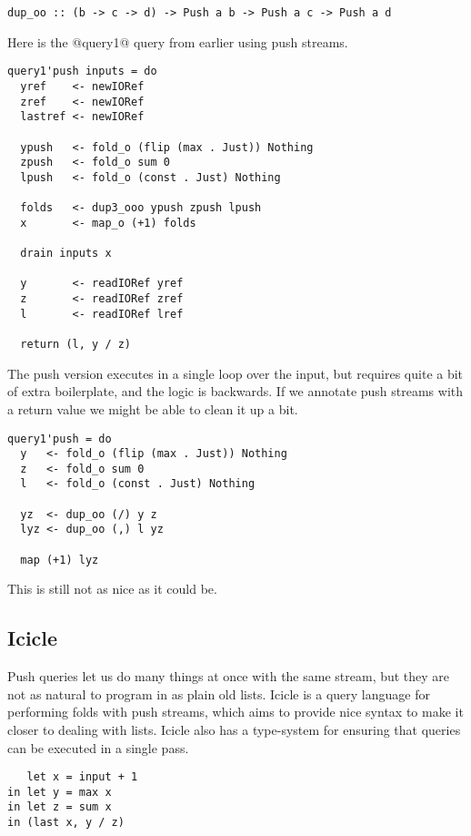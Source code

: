 \begin{lstlisting}
dup_oo :: (b -> c -> d) -> Push a b -> Push a c -> Push a d
\end{lstlisting}

Here is the @query1@ query from earlier using push streams.

\begin{lstlisting}
query1'push inputs = do
  yref    <- newIORef
  zref    <- newIORef
  lastref <- newIORef

  ypush   <- fold_o (flip (max . Just)) Nothing
  zpush   <- fold_o sum 0
  lpush   <- fold_o (const . Just) Nothing

  folds   <- dup3_ooo ypush zpush lpush
  x       <- map_o (+1) folds

  drain inputs x

  y       <- readIORef yref
  z       <- readIORef zref
  l       <- readIORef lref

  return (l, y / z)
\end{lstlisting}

The push version executes in a single loop over the input, but requires quite a bit of extra boilerplate, and the logic is backwards.
If we annotate push streams with a return value we might be able to clean it up a bit.

\begin{lstlisting}
query1'push = do
  y   <- fold_o (flip (max . Just)) Nothing
  z   <- fold_o sum 0
  l   <- fold_o (const . Just) Nothing

  yz  <- dup_oo (/) y z
  lyz <- dup_oo (,) l yz

  map (+1) lyz
\end{lstlisting}


This is still not as nice as it could be.

\subsection{Icicle}

Push queries let us do many things at once with the same stream, but they are not as natural to program in as plain old lists.
Icicle is a query language for performing folds with push streams, which aims to provide nice syntax to make it closer to dealing with lists.
Icicle also has a type-system for ensuring that queries can be executed in a single pass.

\begin{lstlisting}
   let x = input + 1
in let y = max x
in let z = sum x
in (last x, y / z)
\end{lstlisting}

